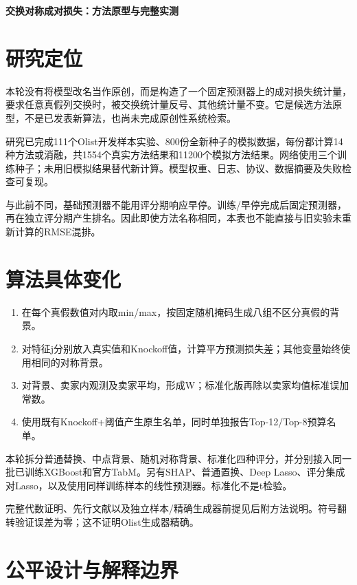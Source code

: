 \documentclass[UTF8,11pt,a4paper]{ctexart}
\providecommand{\tightlist}{\setlength{\itemsep}{0pt}\setlength{\parskip}{0pt}}
\begin{document}
\begin{center}\Large\bfseries 交换对称成对损失：方法原型与完整实测\end{center}\section{研究定位}\label{ux7814ux7a76ux5b9aux4f4d}

本轮没有将模型改名当作原创，而是构造了一个固定预测器上的成对损失统计量，要求任意真假列交换时，被交换统计量反号、其他统计量不变。它是候选方法原型，不是已发表新算法，也尚未完成原创性系统检索。

研究已完成111个Olist开发样本实验、800份全新种子的模拟数据，每份都计算14种方法或消融，共1554个真实方法结果和11200个模拟方法结果。网络使用三个训练种子；未用旧模拟结果替代新计算。模型权重、日志、协议、数据摘要及失败检查可复现。

与此前不同，基础预测器不能用评分期响应早停。训练/早停完成后固定预测器，再在独立评分期产生排名。因此即使方法名称相同，本表也不能直接与旧实验未重新计算的RMSE混排。

\section{算法具体变化}\label{ux7b97ux6cd5ux5177ux4f53ux53d8ux5316}

\begin{enumerate}
\def\labelenumi{\arabic{enumi}.}
\tightlist
\item
  在每个真假数值对内取min/max，按固定随机掩码生成八组不区分真假的背景。
\item
  对特征j分别放入真实值和Knockoff值，计算平方预测损失差；其他变量始终使用相同的对称背景。
\item
  对背景、卖家内观测及卖家平均，形成W；标准化版再除以卖家均值标准误加常数。
\item
  使用既有Knockoff+阈值产生原生名单，同时单独报告Top-12/Top-8预算名单。
\end{enumerate}

本轮拆分普通替换、中点背景、随机对称背景、标准化四种评分，并分别接入同一批已训练XGBoost和官方TabM。另有SHAP、普通置换、Deep Lasso、评分集成对Lasso，以及使用同样训练样本的线性预测器。标准化不是t检验。

完整代数证明、先行文献以及独立样本/精确生成器前提见后附方法说明。符号翻转验证误差为零；这不证明Olist生成器精确。

\section{公平设计与解释边界}\label{ux516cux5e73ux8bbeux8ba1ux4e0eux89e3ux91caux8fb9ux754c}
\end{document}
